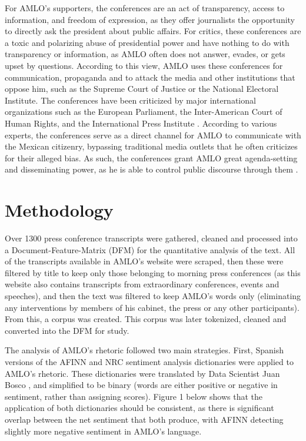 \documentclass[]{article}
\begin{document}
For AMLO's supporters, the conferences are an act of transparency, access to information, and freedom of expression, as they offer journalists the opportunity to directly ask the president about public affairs. For critics, these conferences are a toxic and polarizing abuse of presidential power and have nothing to do with transparency or information, as AMLO often does not answer, evades, or gets upset by questions. According to this view, AMLO uses these conferences for communication, propaganda and to attack the media and other institutions that oppose him, such as the Supreme Court of Justice or the National Electoral Institute. The conferences have been criticized by major international organizations such as the European Parliament, the Inter-American Court of Human Rights, and the International Press Institute \cite{najar_asi_2019}. According to various experts, the conferences serve as a direct channel for AMLO to communicate with the Mexican citizenry, bypassing traditional media outlets that he often criticizes for their alleged bias. As such, the conferences grant AMLO great agenda-setting and disseminating power, as he is able to control public discourse through them \cite{zapata_mananeras_2022}.

\section{Methodology}

Over 1300 press conference transcripts were gathered, cleaned and processed into a Document-Feature-Matrix (DFM) for the quantitative analysis of the text. All of the transcripts available in AMLO's website \cite{noauthor_transcripciones_nodate} were scraped, then these were filtered by title to keep only those belonging to morning press conferences (as this website also contains transcripts from extraordinary conferences, events and speeches), and then the text was filtered to keep AMLO's words only (eliminating any interventions by members of his cabinet, the press or any other participants). From this, a corpus was created. This corpus was later tokenized, cleaned and converted into the DFM for study. 

The analysis of AMLO's rhetoric followed two main strategies. First, Spanish versions of the AFINN and NRC sentiment analysis dictionaries were applied to AMLO's rhetoric. These dictionaries were translated by Data Scientist Juan Bosco \cite{vega_lexicos_2023}, and simplified to be binary (words are either positive or negative in sentiment, rather than assigning scores). Figure 1 below shows that the application of both dictionaries should be consistent, as there is significant overlap between the net sentiment that both produce, with AFINN detecting slightly more negative sentiment in AMLO's language.
\end{document}
